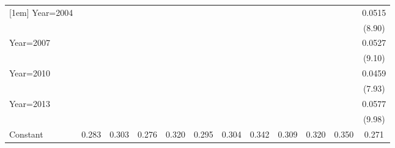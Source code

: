 \begin{table}[htbp]
\begin{tabular}{l*{11}{c}}
[1em]
Year=2004           &                     &                     &                     &                     &                     &                     &                     &                     &                     &                     &      0.0515\sym{***}\\
                    &                     &                     &                     &                     &                     &                     &                     &                     &                     &                     &      (8.90)         \\
[1em]
Year=2007           &                     &                     &                     &                     &                     &                     &                     &                     &                     &                     &      0.0527\sym{***}\\
                    &                     &                     &                     &                     &                     &                     &                     &                     &                     &                     &      (9.10)         \\
[1em]
Year=2010           &                     &                     &                     &                     &                     &                     &                     &                     &                     &                     &      0.0459\sym{***}\\
                    &                     &                     &                     &                     &                     &                     &                     &                     &                     &                     &      (7.93)         \\
[1em]
Year=2013           &                     &                     &                     &                     &                     &                     &                     &                     &                     &                     &      0.0577\sym{***}\\
                    &                     &                     &                     &                     &                     &                     &                     &                     &                     &                     &      (9.98)         \\
[1em]
Constant            &       0.283\sym{***}&       0.303\sym{***}&       0.276\sym{***}&       0.320\sym{***}&       0.295\sym{***}&       0.304\sym{***}&       0.342\sym{***}&       0.309\sym{***}&       0.320\sym{***}&       0.350\sym{***}&       0.271\sym{***}\\

\end{tabular}
\end{table}
